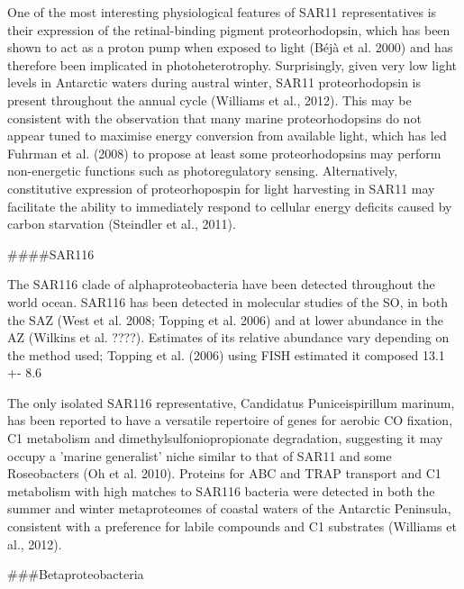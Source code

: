 One of the most interesting physiological features of SAR11 representatives is their expression of the retinal-binding pigment proteorhodopsin, which has been shown to act as a proton pump when exposed to light (Béjà et al. 2000) and has therefore been implicated in photoheterotrophy. Surprisingly, given very low light levels in Antarctic waters during austral winter, SAR11 proteorhodopsin is present throughout the annual cycle (Williams et al., 2012). This may be consistent with the observation that many marine proteorhodopsins do not appear tuned to maximise energy conversion from available light, which has led Fuhrman et al. (2008) to propose at least some proteorhodopsins may perform non-energetic functions such as photoregulatory sensing. Alternatively, constitutive expression of proteorhopospin for light harvesting in SAR11 may facilitate the ability to immediately respond to cellular energy deficits caused by carbon starvation (Steindler et al., 2011).

####SAR116

The SAR116 clade of alphaproteobacteria have been detected throughout the world ocean. SAR116 has been detected in molecular studies of the SO, in both the SAZ (West et al. 2008; Topping et al. 2006) and at lower abundance in the AZ (Wilkins et al. ????). Estimates of its relative abundance vary depending on the method used; Topping et al. (2006) using FISH estimated it composed 13.1 +- 8.6%

The only isolated SAR116 representative, Candidatus Puniceispirillum marinum, has been reported to have a versatile repertoire of genes for aerobic CO fixation, C1 metabolism and dimethylsulfoniopropionate degradation, suggesting it may occupy a 'marine generalist' niche similar to that of SAR11 and some Roseobacters (Oh et al. 2010). Proteins for ABC and TRAP transport and C1 metabolism with high matches to SAR116 bacteria were detected in both the summer and winter metaproteomes of coastal waters of the Antarctic Peninsula, consistent with a preference for labile compounds and C1 substrates (Williams et al., 2012).

###Betaproteobacteria

